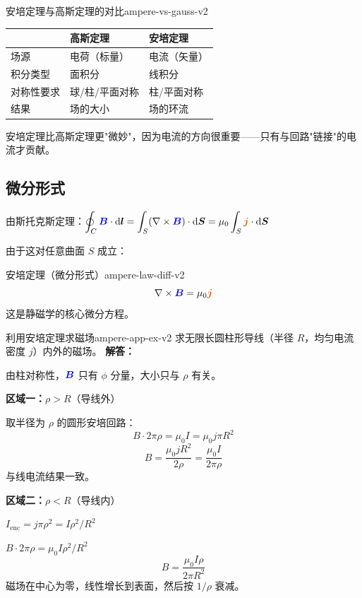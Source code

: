 \documentclass[11pt,a4paper,openany,oneside]{book}
\newcommand{\diff}{\mathrm{d}}
\newcommand{\vecB}{\textcolor{blue}{\vect{B}}}
\newcommand{\vecJ}{\textcolor{cororange}{\vect{j}}}
\newcommand{\muz}{\mu_0}
\newcommand{\vect}[1]{\bm{#1}}
\newcommand{\curl}{\nabla\times}
\newcommand{\difficulty}[1]{\marginnote{\textcolor{red}{\textbf{[#1]}}}}
\begin{document}
\begin{insight}{安培定理与高斯定理的对比}{ampere-vs-gauss-v2}
\begin{center}
\begin{tabular}{@{}lll@{}}
\toprule
& \textbf{高斯定理} & \textbf{安培定理} \\
\midrule
场源 & 电荷（标量） & 电流（矢量） \\
积分类型 & 面积分 & 线积分 \\
对称性要求 & 球/柱/平面对称 & 柱/平面对称 \\
结果 & 场的大小 & 场的环流 \\
\bottomrule
\end{tabular}
\end{center}

安培定理比高斯定理更"微妙"，因为电流的方向很重要——只有与回路"链接"的电流才贡献。
\end{insight}

\subsection{微分形式}

由斯托克斯定理：$\displaystyle\oint_C \vecB\cdot\diff\vect{l} = \int_S (\curl\vecB)\cdot\diff\vect{S} = \muz \int_S \vecJ\cdot\diff\vect{S}$

由于这对任意曲面 $S$ 成立：

\begin{theorem}{安培定理（微分形式）}{ampere-law-diff-v2}
\[
\curl\vecB = \muz\vecJ
\]
这是静磁学的核心微分方程。
\end{theorem}

\begin{example}{利用安培定理求磁场}{ampere-app-ex-v2}
\difficulty{基础}
求无限长圆柱形导线（半径 $R$，均匀电流密度 $j$）内外的磁场。
\tcblower
\textbf{解答：}

由柱对称性，$\vecB$ 只有 $\phi$ 分量，大小只与 $\rho$ 有关。

\textbf{区域一：$\rho > R$}（导线外）

取半径为 $\rho$ 的圆形安培回路：
\[
B \cdot 2\pi\rho = \muz I = \muz j\pi R^2
\]
\[
B = \frac{\muz j R^2}{2\rho} = \frac{\muz I}{2\pi\rho}
\]
与线电流结果一致。

\textbf{区域二：$\rho < R$}（导线内）

$I_{\text{enc}} = j\pi\rho^2 = I\rho^2/R^2$

$B \cdot 2\pi\rho = \muz I\rho^2/R^2$
\[
B = \frac{\muz I\rho}{2\pi R^2}
\]
磁场在中心为零，线性增长到表面，然后按 $1/\rho$ 衰减。
\end{example}
\end{document}
